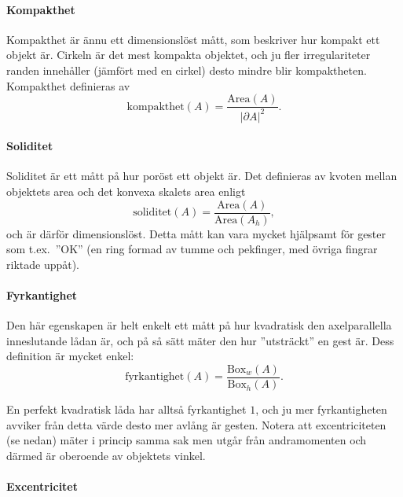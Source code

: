 \documentclass[../rapport_MVEX01-11-05]{subfiles}
\begin{document}
\paragraph{Kompakthet}

Kompakthet \cite[s.~26]{Rudemo09} är ännu ett dimensionslöst mått, som
beskriver hur kompakt ett objekt är.
Cirkeln är det mest kompakta objektet, och ju fler irregulariteter
randen innehåller (jämfört med en cirkel) desto mindre blir kompaktheten.
Kompakthet definieras av
\begin{equation*}
  \textrm{kompakthet}(A) = \frac{\textrm{Area}(A)}{\left|\partial
  A\right|^2}.
\end{equation*}

\paragraph{Soliditet}

Soliditet är ett mått på hur poröst ett objekt är. Det
definieras av kvoten mellan objektets area och det konvexa skalets
area enligt
\begin{equation*}
  \textrm{soliditet}(A) = \frac{\textrm{Area}(A)}{\textrm{Area}(A_h)},
\end{equation*}
och är därför dimensionslöst. Detta mått kan vara mycket hjälpsamt för
gester som t.ex.~''OK'' (en ring formad av tumme och pekfinger, med
övriga fingrar riktade uppåt).

\paragraph{Fyrkantighet}

Den här egenskapen är helt enkelt ett mått på hur kvadratisk den axelparallella
inneslutande lådan är, och på så sätt mäter den hur ''utsträckt'' en
gest är. Dess definition är mycket enkel:
\begin{equation*}
  \textrm{fyrkantighet}(A) = \frac{\textrm{Box}_w(A)}{\textrm{Box}_h(A)}.
\end{equation*}

En perfekt kvadratisk låda har alltså fyrkantighet $1$, och ju mer
fyrkantigheten avviker från detta värde desto mer avlång är gesten.
Notera att excentriciteten (se nedan) mäter i princip samma sak men utgår från
andramomenten och därmed är oberoende av objektets vinkel.

\paragraph{Excentricitet}
\end{document}
